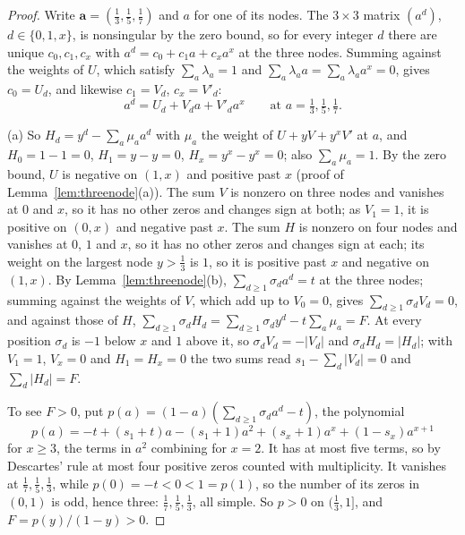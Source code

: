 \documentclass[11pt]{article}
\begin{document}
\begin{proof}
Write $\mathbf a=(\tfrac13,\tfrac15,\tfrac17)$ and $a$ for one of its
nodes.  The $3\times3$ matrix $(a^d)$, $d\in\{0,1,x\}$, is nonsingular by the
zero bound, so for every integer $d$ there are unique $c_0,c_1,c_x$ with
$a^d=c_0+c_1a+c_xa^x$ at the three nodes.  Summing against the weights of
$U$, which satisfy $\sum_a\lambda_a=1$ and $\sum_a\lambda_aa=\sum_a\lambda_aa^x=0$,
gives $c_0=U_d$, and likewise $c_1=V_d$, $c_x=V'_d$:
\begin{equation}\label{eq:threebasis}
  a^d=U_d+V_da+V'_da^x\qquad\text{at }a=\tfrac13,\tfrac15,\tfrac17 .
\end{equation}

(a) So $H_d=y^d-\sum_a\mu_aa^d$ with $\mu_a$ the weight of $U+yV+y^xV'$ at
$a$, and $H_0=1-1=0$, $H_1=y-y=0$, $H_x=y^x-y^x=0$; also $\sum_a\mu_a=1$.
By the zero bound, $U$ is negative on $(1,x)$ and positive past $x$
(proof of Lemma~\ref{lem:threenode}(a)).  The sum $V$ is nonzero on three
nodes and vanishes at $0$ and $x$, so it has no other zeros and changes
sign at both; as $V_1=1$, it is positive on $(0,x)$ and negative past $x$.
The sum $H$ is nonzero on four nodes and vanishes at $0$, $1$ and $x$, so it
has no other zeros and changes sign at each; its weight on the largest node
$y>\tfrac13$ is $1$, so it is positive past $x$ and negative on $(1,x)$.  By
Lemma~\ref{lem:threenode}(b), $\sum_{d\ge1}\sigma_da^d=t$ at the three
nodes; summing against the weights of $V$, which add up to $V_0=0$, gives
$\sum_{d\ge1}\sigma_dV_d=0$, and against those of $H$,
$\sum_{d\ge1}\sigma_dH_d=\sum_{d\ge1}\sigma_dy^d-t\sum_a\mu_a=F$.  At
every position $\sigma_d$ is $-1$ below $x$ and $1$ above it, so
$\sigma_dV_d=-|V_d|$ and $\sigma_dH_d=|H_d|$; with $V_1=1$, $V_x=0$ and
$H_1=H_x=0$ the two sums read $s_1-\sum_d|V_d|=0$ and $\sum_d|H_d|=F$.

To see $F>0$, put $p(a)=(1-a)(\sum_{d\ge1}\sigma_da^d-t)$, the polynomial
\[
  p(a)=-t+(s_1+t)a-(s_1+1)a^2+(s_x+1)a^x+(1-s_x)a^{x+1}
\]
for $x\ge3$, the terms in $a^2$ combining for $x=2$.  It has at most
five terms, so by Descartes' rule at most four positive zeros counted with
multiplicity.  It vanishes at $\tfrac17,\tfrac15,\tfrac13$, while
$p(0)=-t<0<1=p(1)$, so the number of its zeros in $(0,1)$ is odd, hence
three: $\tfrac17,\tfrac15,\tfrac13$, all simple.  So $p>0$ on
$(\tfrac13,1]$, and $F=p(y)/(1-y)>0$.


\end{proof}
\end{document}
